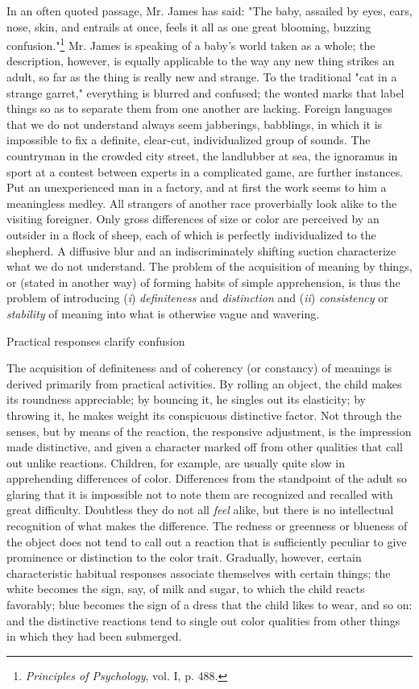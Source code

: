 \documentclass[letterpaper]{book}
\begin{document}
In an often quoted passage, Mr. James has said: "The baby, assailed by
eyes, ears, nose, skin, and entrails at once, feels it all as one great
blooming, buzzing
confusion."\footnote{
\emph{Principles of Psychology}, vol. I, p. 488.
}
Mr. James is speaking of a baby's world taken as a whole; the
description, however, is equally applicable to the way any new thing
strikes an adult, so far as the thing is really new and strange. To the
traditional "cat in a strange garret," everything is blurred and
confused; the wonted marks that label things so as to separate them from
one another are lacking. Foreign languages that we do not understand
always seem jabberings, babblings, in which it is impossible to fix a
definite, clear-cut, individualized group of sounds. The countryman in
the crowded city street, the landlubber at sea, the ignoramus in sport
at a contest between experts in a complicated game, are further
instances. Put an unexperienced man in a factory, and at first the work
seems to him a meaningless medley. All strangers of another race
proverbially look alike to the
visiting
foreigner. Only gross differences of size or color are perceived by an
outsider in a flock of sheep, each of which is perfectly individualized
to the shepherd. A diffusive blur and an indiscriminately shifting
suction characterize what we do not understand. The problem of the
acquisition of meaning by things, or (stated in another way) of forming
habits of simple apprehension, is thus the problem of introducing
(\emph{i}) \emph{definiteness} and \emph{distinction} and (\emph{ii})
\emph{consistency} or \emph{stability} of meaning into what is otherwise
vague and wavering.

Practical responses clarify confusion

The acquisition of definiteness and of coherency (or constancy) of
meanings is derived primarily from practical activities. By rolling an
object, the child makes its roundness appreciable; by bouncing it, he
singles out its elasticity; by throwing it, he makes weight its
conspicuous distinctive factor. Not through the senses, but by means of
the reaction, the responsive adjustment, is the impression made
distinctive, and given a character marked off from other qualities that
call out unlike reactions. Children, for example, are usually quite slow
in apprehending differences of color. Differences from the standpoint of
the adult so glaring that it is impossible not to note them are
recognized and recalled with great difficulty. Doubtless they do not all
\emph{feel} alike, but there is no intellectual recognition of what
makes the difference. The redness or greenness or blueness of the object
does not tend to call out a reaction that is sufficiently peculiar to
give prominence or distinction to the color trait. Gradually, however,
certain characteristic habitual responses associate themselves with
certain things; the white becomes the sign, say, of milk and sugar, to
which the child reacts favorably; blue becomes the sign of a dress that
the child likes to wear, and so on: and
the
distinctive reactions tend to single out color qualities from other
things in which they had been submerged.
\end{document}
